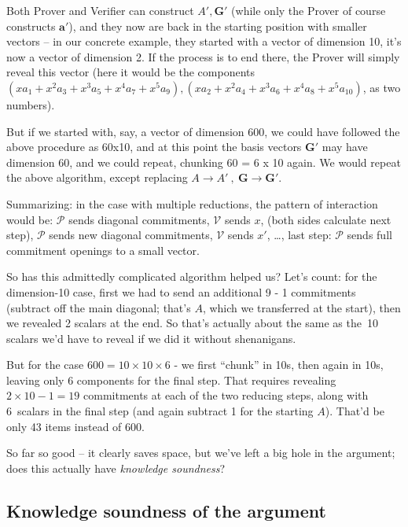 \documentclass[10pt,a4paper]{article}
\begin{document}
Both Prover and Verifier can construct $A', \mathbf{G}'$ (while only the Prover of course
constructs $\mathbf{a}'$), and they now are back in the starting position with
smaller vectors -- in our concrete example, they started with a vector
of dimension 10, it's now a vector of dimension 2. If the process is to
end there, the Prover will simply reveal this vector (here it would be
the components 
$(xa_1 + x^2 a_3 + x^3 a_5 + x^4 a_7 + x^5 a_9), (xa_2 + x^2 a_4 + x^3 a_6 + x^4 a_8 + x^5 a_{10})$, 
as two numbers).

But if we started with, say, a vector of dimension 600, we could have
followed the above procedure as 60x10, and at this point the basis
vectors $\mathbf{G}'$ may have dimension 60, and we could repeat, chunking 60 = 6 x 10
again. We would repeat the above algorithm, except replacing $A \rightarrow A' \ ,\ \mathbf{G} \rightarrow \mathbf{G}'$.

Summarizing: in the case with multiple reductions, the pattern of
interaction would be: $\mathcal{P}$ sends diagonal commitments, $\mathcal{V}$ sends $x$, (both
sides calculate next step), $\mathcal{P}$ sends new diagonal commitments, $\mathcal{V}$ sends $x'$,
\ldots{}, last step: $\mathcal{P}$ sends full commitment openings to a small vector.

So has this admittedly complicated algorithm helped us? Let's count: for
the dimension-10 case, first we had to send an additional 9 - 1
commitments (subtract off the main diagonal; that's $A$, which we
transferred at the start), then we revealed 2 scalars at the end. So
that's actually about the same as the~10 scalars we'd have
to reveal if we did it without shenanigans.

But for the case $600 = 10 \times 10 \times 6$ - we first ``chunk'' in 10s, then
again in 10s, leaving only 6 components for the final step. That
requires revealing $2\times 10-1 = 19$ commitments at each of the two reducing
steps, along with 6~scalars in the final step (and again subtract 1 for
the starting $A$). That'd be only 43 items instead of 600.

So far so good -- it clearly saves space, but we've left a big hole in
the argument; does this actually have \emph{knowledge soundness}?

\hypertarget{knowledge-soundness-of-the-argument}{%
\subsection[Knowledge soundness of the
argument]{\texorpdfstring{\protect\hypertarget{anchor-45}{}{}Knowledge
soundness of the
argument}{Knowledge soundness of the argument}}\label{knowledge-soundness-of-the-argument}}
\end{document}
